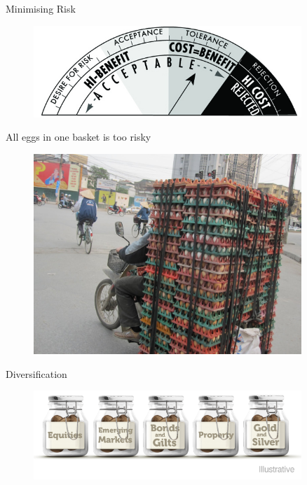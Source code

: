 \documentclass[handout]{beamer}
\begin{document}
\begin{frame}{Minimising Risk}
  \begin{figure}
    \centering
    \includegraphics[width = 0.9\textwidth]{figures/risk.jpg}
  \end{figure}
\end{frame}

\begin{frame}{All eggs in one basket is too risky}
  \begin{figure}
    \centering
    \includegraphics[width = 0.9\textwidth]{figures/alleggs.jpg}
  \end{figure}
\end{frame}

\begin{frame}{Diversification}
  \begin{figure}
    \centering
    \includegraphics[width = 0.9\textwidth]{figures/allegg2.png}
  \end{figure}
\end{frame}
\end{document}
